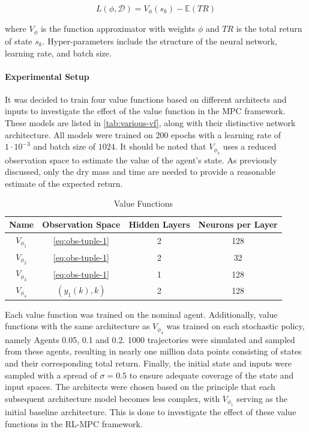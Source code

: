 \begin{equation}\label{eq:vf_tr_loss}
    L(\phi, \mathcal{D}) =   V_{\phi}(s_k) - \mathbb{E}(TR)
\end{equation}

where $V_{\phi}$ is the function approximator with weights $\phi$ and $TR$ is the total return of state $s_k$. Hyper-parameters include the structure of the neural network, learning rate, and batch size.\\



\paragraph{Experimental Setup}
It was decided to train four value functions based on different architects and inputs to investigate the effect of the value function in the MPC framework. These models are listed in \autoref{tab:various-vf}, along with their distinctive network architecture. All models were trained on 200 epochs with a learning rate of $1 \cdot 10^{-3}$ and batch size of $1024$. It should be noted that $V_{\phi_4}$ uses a reduced observation space to estimate the value of the agent's state. As previously discussed, only the dry mass and time are needed to provide a reasonable estimate of the expected return.

\begin{table}[H]
	\centering
	\renewcommand{\arraystretch}{1.3}
	\setlength{\tabcolsep}{12pt}
	\begin{tabular}{cccc}
		\toprule
		\textbf{Name} & \textbf{Observation Space} & \textbf{Hidden Layers} & \textbf{Neurons per Layer} \\
		\midrule
		$V_{\phi_1}$ & \autoref{eq:obs-tuple-1} & 2 & 128 \\  
		$V_{\phi_2}$ & \autoref{eq:obs-tuple-1} & 2 & 32 \\  
		$V_{\phi_3}$ & \autoref{eq:obs-tuple-1} & 1 & 128 \\  
		$V_{\phi_4}$ & $(y_1(k), k)$ & 2 & 128 \\  
		\bottomrule
	\end{tabular}
	\caption{Value Functions}
	\label{tab:various-vf}
\end{table}

Each value function was trained on the nominal agent. Additionally, value functions with the same architecture as $V_{\phi_4}$ was trained on each stochastic policy, namely Agents 0.05, 0.1 and 0.2. 1000 trajectories were simulated and sampled from these agents, resulting in nearly one million data points consisting of states and their corresponding total return. Finally, the initial state and inputs were sampled with a spread of $\sigma = 0.5$ to ensure adequate coverage of the state and input spaces. The architects were chosen based on the principle that each subsequent architecture model becomes less complex, with $V_{\phi_1}$ serving as the initial baseline architecture. This is done to investigate the effect of these value functions in the RL-MPC framework.

